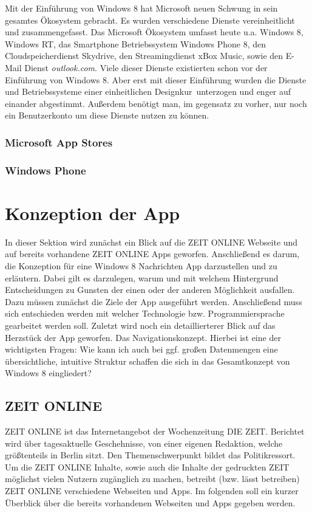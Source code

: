 \documentclass[12pt,a4paper,bibtotoc,abstracton]{scrartcl}
\begin{document}
Mit der Einführung von Windows 8 hat Microsoft neuen Schwung in sein gesamtes Ökosystem gebracht. Es wurden verschiedene Dienste vereinheitlicht und zusammengefasst. Das Microsoft Ökosystem umfasst heute u.a. Windows 8, Windows RT, das Smartphone Betriebssystem Windows Phone 8, den Cloudspeicherdienst Skydrive, den Streamingdienst xBox Music, sowie den E-Mail Dienst \textit{outlook.com}. Viele dieser Dienste existierten schon vor der Einführung von Windows 8. Aber erst mit dieser Einführung wurden die Dienste und Betriebssysteme einer einheitlichen \glqq Designkur\grqq\ unterzogen und enger auf einander abgestimmt. Außerdem benötigt man, im gegensatz zu vorher, nur noch ein Benutzerkonto um diese Dienste nutzen zu können.

\subsubsection{Microsoft App Stores}
\label{subsubsec:stores}
\subsubsection{Windows Phone}
\label{subsubsec:windowsphone}


\newpage
\section{Konzeption der App}
\label{sec:konzeption}
In dieser Sektion wird zunächst ein Blick auf die ZEIT ONLINE Webseite und auf bereits vorhandene ZEIT ONLINE Apps geworfen. Anschließend es darum, die Konzeption für eine Windows 8 Nachrichten App darzustellen und zu erläutern. Dabei gilt es darzulegen, warum und mit welchem Hintergrund Entscheidungen zu Gunsten der einen oder der anderen Möglichkeit ausfallen. Dazu müssen zunächst die Ziele der App ausgeführt werden. Anschließend muss sich entschieden werden mit welcher Technologie bzw. Programmiersprache gearbeitet werden soll. Zuletzt wird noch ein detaillierterer Blick auf das Herzstück der App geworfen. Das Navigationskonzept. Hierbei ist eine der wichtigsten Fragen: \glqq Wie kann ich auch bei ggf. großen Datenmengen eine übersichtliche, intuitive Struktur schaffen die sich in das Gesamtkonzept von Windows 8 eingliedert?\grqq  

\subsection{ZEIT ONLINE}
\label{subsec:zeitonline}
ZEIT ONLINE ist das Internetangebot der Wochenzeitung DIE ZEIT. Berichtet wird über tagesaktuelle Geschehnisse, von einer eigenen Redaktion, welche größtenteils in Berlin sitzt. Den Themenschwerpunkt bildet das Politikressort. Um die ZEIT ONLINE Inhalte, sowie auch die Inhalte der gedruckten ZEIT möglichst vielen Nutzern zugänglich zu machen, betreibt (bzw. lässt betreiben) ZEIT ONLINE verschiedene Webseiten und Apps. Im folgenden soll ein kurzer Überblick über die bereits vorhandenen Webseiten und Apps gegeben werden.
\end{document}
